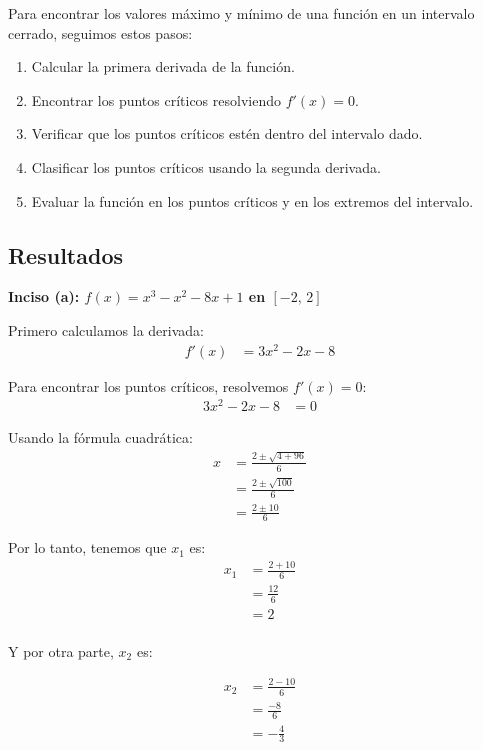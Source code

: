 \documentclass{article}
\begin{document}
Para encontrar los valores máximo y mínimo de una función en un intervalo cerrado, seguimos estos pasos:
\begin{enumerate}
    \item Calcular la primera derivada de la función.
    \item Encontrar los puntos críticos resolviendo $f'(x) = 0$.
    \item Verificar que los puntos críticos estén dentro del intervalo dado.
    \item Clasificar los puntos críticos usando la segunda derivada.
    \item Evaluar la función en los puntos críticos y en los extremos del intervalo.
\end{enumerate}

\subsection{Resultados}
\setcounter{equation}{0}

\textbf{Inciso (a): $f(x) = x^{3} - x^{2} - 8x + 1$ en $[-2,\,2]$}

Primero calculamos la derivada:
\begin{align}
f'(x) &= 3x^{2} - 2x - 8
\end{align}

Para encontrar los puntos críticos, resolvemos $f'(x) = 0$:
\begin{align}
3x^{2} - 2x - 8 &= 0
\end{align}

Usando la fórmula cuadrática:
\begin{align}
x &= \frac{2 \pm \sqrt{4 + 96}}{6} \\
&= \frac{2 \pm \sqrt{100}}{6} \\
&= \frac{2 \pm 10}{6}
\end{align}

Por lo tanto, tenemos que $x_1$ es:
\begin{align}
x_{1} &= \frac{2 + 10}{6} \\
&= \frac{12}{6} \\
&= 2 \\
\end{align}

Y por otra parte, $x_2$ es:

\begin{align}
    x_{2} &= \frac{2 - 10}{6} \\
    &= \frac{-8}{6} \\
    &= -\frac{4}{3}
\end{align}
\end{document}
